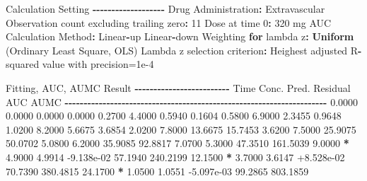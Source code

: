 \documentclass[
  10pt,
]{krantz}
\makeatletter
\newenvironment{Shaded}{\begin{snugshade}}{\end{snugshade}}
\newcommand{\ControlFlowTok}[1]{\textcolor[rgb]{0.13,0.29,0.53}{\textbf{#1}}}
\newcommand{\DecValTok}[1]{\textcolor[rgb]{0.00,0.00,0.81}{#1}}
\newcommand{\FloatTok}[1]{\textcolor[rgb]{0.00,0.00,0.81}{#1}}
\newcommand{\KeywordTok}[1]{\textcolor[rgb]{0.13,0.29,0.53}{\textbf{#1}}}
\newcommand{\NormalTok}[1]{#1}
\newcommand{\OperatorTok}[1]{\textcolor[rgb]{0.81,0.36,0.00}{\textbf{#1}}}
\newcommand{\StringTok}[1]{\textcolor[rgb]{0.31,0.60,0.02}{#1}}
\newenvironment{kframe}{%
\medskip{}
\setlength{\fboxsep}{.8em}
 \def\at@end@of@kframe{}%
 \ifinner\ifhmode%
  \def\at@end@of@kframe{\end{minipage}}%
  \begin{minipage}{\columnwidth}%
 \fi\fi%
 \def\FrameCommand##1{\hskip\@totalleftmargin \hskip-\fboxsep
 \colorbox{shadecolor}{##1}\hskip-\fboxsep
     \hskip-\linewidth \hskip-\@totalleftmargin \hskip\columnwidth}%
 \MakeFramed {\advance\hsize-\width
   \@totalleftmargin\z@ \linewidth\hsize
   \@setminipage}}%
 {\par\unskip\endMakeFramed%
 \at@end@of@kframe}
\renewenvironment{Shaded}{\begin{kframe}}{\end{kframe}}
\makeatother
\begin{document}
\begin{Shaded}
\begin{Highlighting}[]
\NormalTok{Calculation Setting}
\OperatorTok{{-}{-}{-}{-}{-}{-}{-}{-}{-}{-}{-}{-}{-}{-}{-}{-}{-}{-}{-}}
\NormalTok{Drug Administration}\OperatorTok{:}\StringTok{ }\NormalTok{Extravascular}
\NormalTok{Observation count excluding trailing zero}\OperatorTok{:}\StringTok{ }\DecValTok{11}
\NormalTok{Dose at time }\DecValTok{0}\OperatorTok{:}\StringTok{ }\DecValTok{320}\NormalTok{ mg}
\NormalTok{AUC Calculation Method}\OperatorTok{:}\StringTok{ }\NormalTok{Linear}\OperatorTok{{-}}\NormalTok{up Linear}\OperatorTok{{-}}\NormalTok{down}
\NormalTok{Weighting }\ControlFlowTok{for}\NormalTok{ lambda z}\OperatorTok{:}\StringTok{ }\KeywordTok{Uniform}\NormalTok{ (Ordinary Least Square, OLS)}
\NormalTok{Lambda z selection criterion}\OperatorTok{:}\StringTok{ }\NormalTok{Heighest adjusted R}\OperatorTok{{-}}\NormalTok{squared value with precision=}\FloatTok{1e{-}4}


\NormalTok{Fitting, AUC, AUMC Result}
\OperatorTok{{-}{-}{-}{-}{-}{-}{-}{-}{-}{-}{-}{-}{-}{-}{-}{-}{-}{-}{-}{-}{-}{-}{-}{-}{-}}
\StringTok{      }\NormalTok{Time         Conc.      Pred.   Residual       AUC       AUMC}
\OperatorTok{{-}{-}{-}{-}{-}{-}{-}{-}{-}{-}{-}{-}{-}{-}{-}{-}{-}{-}{-}{-}{-}{-}{-}{-}{-}{-}{-}{-}{-}{-}{-}{-}{-}{-}{-}{-}{-}{-}{-}{-}{-}{-}{-}{-}{-}{-}{-}{-}{-}{-}{-}{-}{-}{-}{-}{-}{-}{-}{-}{-}{-}{-}{-}{-}{-}{-}{-}{-}{-}}
\StringTok{     }\FloatTok{0.0000}       \FloatTok{0.0000}                           \FloatTok{0.0000}     \FloatTok{0.0000}
     \FloatTok{0.2700}       \FloatTok{4.4000}                           \FloatTok{0.5940}     \FloatTok{0.1604}
     \FloatTok{0.5800}       \FloatTok{6.9000}                           \FloatTok{2.3455}     \FloatTok{0.9648}
     \FloatTok{1.0200}       \FloatTok{8.2000}                           \FloatTok{5.6675}     \FloatTok{3.6854}
     \FloatTok{2.0200}       \FloatTok{7.8000}                          \FloatTok{13.6675}    \FloatTok{15.7453}
     \FloatTok{3.6200}       \FloatTok{7.5000}                          \FloatTok{25.9075}    \FloatTok{50.0702}
     \FloatTok{5.0800}       \FloatTok{6.2000}                          \FloatTok{35.9085}    \FloatTok{92.8817}
     \FloatTok{7.0700}       \FloatTok{5.3000}                          \FloatTok{47.3510}   \FloatTok{161.5039}
     \FloatTok{9.0000} \OperatorTok{*}\StringTok{     }\FloatTok{4.9000}     \FloatTok{4.9914} \FloatTok{{-}9.138e{-}02}    \FloatTok{57.1940}   \FloatTok{240.2199}
    \FloatTok{12.1500} \OperatorTok{*}\StringTok{     }\FloatTok{3.7000}     \FloatTok{3.6147} \FloatTok{+8.528e{-}02}    \FloatTok{70.7390}   \FloatTok{380.4815}
    \FloatTok{24.1700} \OperatorTok{*}\StringTok{     }\FloatTok{1.0500}     \FloatTok{1.0551} \FloatTok{{-}5.097e{-}03}    \FloatTok{99.2865}   \FloatTok{803.1859}


\end{Highlighting}
\end{Shaded}
\end{document}
